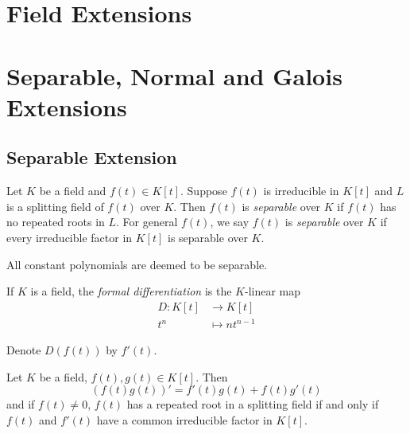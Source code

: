 \documentclass[a4paper]{article}
\begin{document}


\tableofcontents

\section{Field Extensions}


\section{Separable, Normal and Galois Extensions}

\subsection{Separable Extension}

\begin{definition}
  Let \(K\) be a field and \(f(t) \in K[t]\). Suppose \(f(t)\) is irreducible in \(K[t]\) and \(L\) is a splitting field of \(f(t)\) over \(K\). Then \(f(t)\) is \emph{separable} over \(K\) if \(f(t)\) has no repeated roots in \(L\). For general \(f(t)\), we say \(f(t)\) is \emph{separable} over \(K\) if every irreducible factor in \(K[t]\) is separable over \(K\).

  All constant polynomials are deemed to be separable.
\end{definition}

\begin{definition}
  If \(K\) is a field, the \emph{formal differentiation} is the \(K\)-linear map 
  \begin{align*}
    D: K[t] &\to K[t] \\
    t^n &\mapsto n t^{n-1}
  \end{align*}
\end{definition}

\begin{notation}
  Denote \(D(f(t))\) by \(f'(t)\).
\end{notation}

\begin{lemma}
  \label{lem:formal derivative}
  Let \(K\) be a field, \(f(t), g(t) \in K[t]\). Then
  \[
    (f(t)g(t))' = f'(t)g(t) + f(t)g'(t)
  \]
  and if \(f(t) \neq 0\), \(f(t)\) has a repeated root in a splitting field if and only if \(f(t)\) and \(f'(t)\) have a common irreducible factor in \(K[t]\).
\end{lemma}
\end{document}

